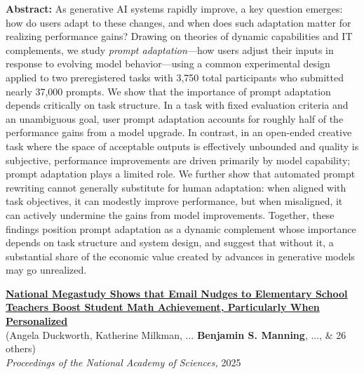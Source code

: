 \documentclass[margin,line,pifont,palatino,courier, 9pt]{res}
\begin{document}
\begin{resume}
\begin{singlespace}
\footnotesize
\textbf{Abstract:}
As generative AI systems rapidly improve, a key question emerges: how do users adapt to these changes, and when does such adaptation matter for realizing performance gains? Drawing on theories of dynamic capabilities and IT complements, we study \textit{prompt adaptation}---how users adjust their inputs in response to evolving model behavior---using a common experimental design applied to two preregistered tasks with 3,750 total participants who submitted nearly 37,000 prompts. We show that the importance of prompt adaptation depends critically on task structure. In a task with fixed evaluation criteria and an unambiguous goal, user prompt adaptation accounts for roughly half of the performance gains from a model upgrade. In contrast, in an open-ended creative task where the space of acceptable outputs is effectively unbounded and quality is subjective, performance improvements are driven primarily by model capability; prompt adaptation plays a limited role. We further show that automated prompt rewriting cannot generally substitute for human adaptation: when aligned with task objectives, it can modestly improve performance, but when misaligned, it can actively undermine the gains from model improvements. Together, these findings position prompt adaptation as a dynamic complement whose importance depends on task structure and system design, and suggest that without it, a substantial share of the economic value created by advances in generative models may go unrealized.
\end{singlespace}


\href{https://www.pnas.org/doi/10.1073/pnas.2418616122}{\bf National Megastudy Shows that Email Nudges to Elementary School Teachers Boost Student Math Achievement, Particularly When Personalized}\\
(Angela Duckworth\footnotemark[\value{footnote}], Katherine Milkman, ... \textbf{Benjamin S. Manning}, ..., \& 26 others)\\
\textit{Proceedings of the National Academy of Sciences,} 2025


\end{resume}
\end{document}
